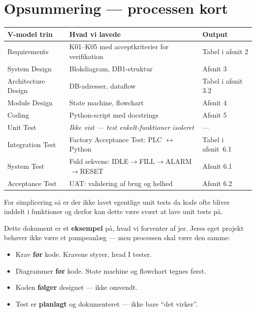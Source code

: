 \documentclass[12pt, a4paper]{article}
\begin{document}
\section{Opsummering --- processen kort}

\begin{center}
\begin{tabular}{lll}
\toprule
\textbf{V-model trin} & \textbf{Hvad vi lavede} & \textbf{Output} \\
\midrule
Requirements          & K01--K05 med acceptkriterier for verifikation & Tabel i afsnit 2 \\
System Design         & Blokdiagram, DB1-struktur          & Afsnit 3 \\
Architecture Design   & DB-adresser, dataflow              & Tabel i afsnit 3.2 \\
Module Design         & State machine, flowchart           & Afsnit 4 \\
Coding                & Python-script med docstrings       & Afsnit 5 \\
Unit Test             & \textit{Ikke vist --- test enkelt-funktioner isoleret} & --- \\
Integration Test      & Factory Acceptance Test: PLC $\leftrightarrow$ Python & Tabel i afsnit~6.1\\
System Test           & Fuld sekvens: IDLE$\to$FILL$\to$ALARM$\to$RESET & Afsnit 6.1 \\
Acceptance Test       & UAT: validering af brug og helhed  & Afsnit 6.2 \\
\bottomrule
\end{tabular}
\end{center}
For simplicering så er der ikke lavet egentlige unit tests da kode ofte bliver inddelt i funktioner og derfor kan dette være svært at lave unit tests på.
\vspace{0.5cm}

\begin{tcolorbox}[tipbox, title={\faStar\quad Det er sådan vi gerne vil have det}]
Dette dokument er et \textbf{eksempel} på, hvad vi forventer af jer.
Jeres eget projekt behøver ikke være et pumpeanlæg --- men processen
skal være den samme:

\begin{itemize}[leftmargin=1.2em, itemsep=4pt]
  \item[\textcolor{successgreen}{\faArrowRight}]
    Krav \textbf{før} kode. Kravene styrer, hvad I tester.
  \item[\textcolor{successgreen}{\faArrowRight}]
    Diagrammer \textbf{før} kode. State machine og flowchart tegnes først.
  \item[\textcolor{successgreen}{\faArrowRight}]
    Koden \textbf{følger} designet --- ikke omvendt.
  \item[\textcolor{successgreen}{\faArrowRight}]
    Test er \textbf{planlagt} og dokumenteret --- ikke bare ``det virker''.
\end{itemize}
\end{tcolorbox}
\end{document}
